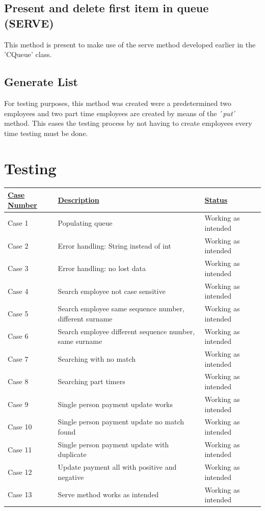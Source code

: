 \documentclass[12pt]{article}
\begin{document}
\subsection{Present and delete first item in queue (SERVE)}
This method is present to make use of the serve method developed earlier in the 'CQueue' class.

\subsection{Generate List}
For testing purposes, this method was created were a predetermined two employees and two part time employees are created by means of the ´\emph{put}´ method. This eases the testing process by not having to create employees every time testing must be done.

\newpage
\section{Testing}

\begin{tabularx}{1\textwidth} { 
  | >{\raggedright\arraybackslash}X 
  | >{\centering\arraybackslash}X 
  | >{\raggedleft\arraybackslash}X | }
 \hline
 \underline{Case Number} & \underline{Description} & \underline{Status} \\
 \hline
 Case 1  & Populating queue  & Working as intended  \\
\hline
 Case 2  & Error handling: String instead of int  & Working as intended  \\
\hline
 Case 3  & Error handling: no lost data  & Working as intended  \\
\hline
 Case 4  & Search employee not case sensitive & Working as intended  \\
\hline
 Case 5  & Search employee same sequence number, different surname  & Working as intended  \\
\hline
 Case 6 & Search employee different sequence number, same surname  & Working as intended  \\
\hline
 Case 7  & Searching with no match & Working as intended  \\
\hline
 Case 8  & Searching part timers  & Working as intended \\
\hline
 Case 9  & Single person payment update works  & Working as intended  \\
\hline
 Case 10  & Single person payment update no match found  & Working as intended  \\
\hline
 Case 11  & Single person payment update with duplicate & Working as intended  \\
\hline
 Case 12  & Update payment all with positive and negative & Working as intended \\
\hline
 Case 13  & Serve method works as intended  & Working as intended \\
\hline
\end{tabularx}
\end{document}
